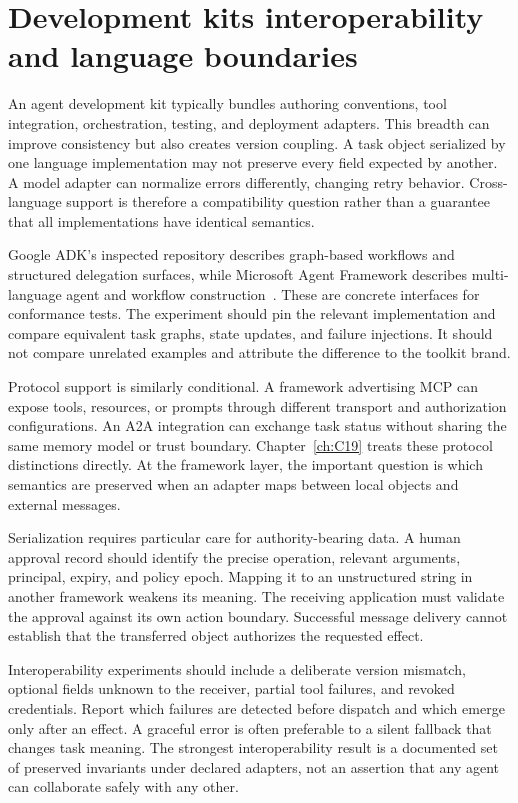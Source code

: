 \section{Development kits interoperability and language boundaries}\label{sec:C22:adks}
An agent development kit typically bundles authoring conventions, tool integration, orchestration, testing, and deployment adapters. This breadth can improve consistency but also creates version coupling. A task object serialized by one language implementation may not preserve every field expected by another. A model adapter can normalize errors differently, changing retry behavior. Cross-language support is therefore a compatibility question rather than a guarantee that all implementations have identical semantics.

Google ADK's inspected repository describes graph-based workflows and structured delegation surfaces, while Microsoft Agent Framework describes multi-language agent and workflow construction~\cite{executionproduct003,executionproduct007}. These are concrete interfaces for conformance tests. The experiment should pin the relevant implementation and compare equivalent task graphs, state updates, and failure injections. It should not compare unrelated examples and attribute the difference to the toolkit brand.

Protocol support is similarly conditional. A framework advertising MCP can expose tools, resources, or prompts through different transport and authorization configurations. An A2A integration can exchange task status without sharing the same memory model or trust boundary. Chapter~\ref{ch:C19} treats these protocol distinctions directly. At the framework layer, the important question is which semantics are preserved when an adapter maps between local objects and external messages.

Serialization requires particular care for authority-bearing data. A human approval record should identify the precise operation, relevant arguments, principal, expiry, and policy epoch. Mapping it to an unstructured string in another framework weakens its meaning. The receiving application must validate the approval against its own action boundary. Successful message delivery cannot establish that the transferred object authorizes the requested effect.

Interoperability experiments should include a deliberate version mismatch, optional fields unknown to the receiver, partial tool failures, and revoked credentials. Report which failures are detected before dispatch and which emerge only after an effect. A graceful error is often preferable to a silent fallback that changes task meaning. The strongest interoperability result is a documented set of preserved invariants under declared adapters, not an assertion that any agent can collaborate safely with any other.

